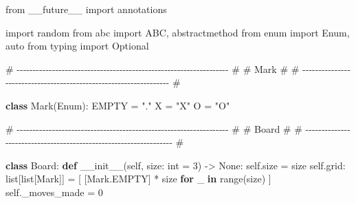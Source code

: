 \documentclass[11pt]{article}
\newenvironment{Shaded}{\begin{snugshade}}{\end{snugshade}}
\newcommand{\BuiltInTok}[1]{\textcolor[rgb]{0.50,0.55,0.55}{#1}}
\newcommand{\CommentTok}[1]{\textcolor[rgb]{0.48,0.49,0.49}{#1}}
\newcommand{\ControlFlowTok}[1]{\textcolor[rgb]{0.99,0.74,0.29}{\textbf{#1}}}
\newcommand{\DecValTok}[1]{\textcolor[rgb]{0.96,0.45,0.00}{#1}}
\newcommand{\FunctionTok}[1]{\textcolor[rgb]{0.56,0.27,0.68}{#1}}
\newcommand{\ImportTok}[1]{\textcolor[rgb]{0.15,0.68,0.38}{#1}}
\newcommand{\KeywordTok}[1]{\textcolor[rgb]{0.81,0.81,0.76}{\textbf{#1}}}
\newcommand{\NormalTok}[1]{\textcolor[rgb]{0.81,0.81,0.76}{#1}}
\newcommand{\OperatorTok}[1]{\textcolor[rgb]{0.81,0.81,0.76}{#1}}
\newcommand{\StringTok}[1]{\textcolor[rgb]{0.96,0.31,0.31}{#1}}
\newcommand{\VariableTok}[1]{\textcolor[rgb]{0.15,0.68,0.68}{#1}}
\begin{document}
\begin{Shaded}
\begin{Highlighting}[]
\ImportTok{from}\NormalTok{ \_\_future\_\_ }\ImportTok{import}\NormalTok{ annotations}

\ImportTok{import}\NormalTok{ random}
\ImportTok{from}\NormalTok{ abc }\ImportTok{import}\NormalTok{ ABC, abstractmethod}
\ImportTok{from}\NormalTok{ enum }\ImportTok{import}\NormalTok{ Enum, auto}
\ImportTok{from}\NormalTok{ typing }\ImportTok{import}\NormalTok{ Optional}


\CommentTok{\# {-}{-}{-}{-}{-}{-}{-}{-}{-}{-}{-}{-}{-}{-}{-}{-}{-}{-}{-}{-}{-}{-}{-}{-}{-}{-}{-}{-}{-}{-}{-}{-}{-}{-}{-}{-}{-}{-}{-}{-}{-}{-}{-}{-}{-}{-}{-}{-}{-}{-}{-}{-}{-}{-}{-}{-}{-}{-}{-}{-}{-}{-}{-}{-}{-}{-} \#}
\CommentTok{\# Mark                                                                \#}
\CommentTok{\# {-}{-}{-}{-}{-}{-}{-}{-}{-}{-}{-}{-}{-}{-}{-}{-}{-}{-}{-}{-}{-}{-}{-}{-}{-}{-}{-}{-}{-}{-}{-}{-}{-}{-}{-}{-}{-}{-}{-}{-}{-}{-}{-}{-}{-}{-}{-}{-}{-}{-}{-}{-}{-}{-}{-}{-}{-}{-}{-}{-}{-}{-}{-}{-}{-}{-} \#}

\KeywordTok{class}\NormalTok{ Mark(Enum):}
\NormalTok{    EMPTY }\OperatorTok{=} \StringTok{"."}
\NormalTok{    X }\OperatorTok{=} \StringTok{"X"}
\NormalTok{    O }\OperatorTok{=} \StringTok{"O"}


\CommentTok{\# {-}{-}{-}{-}{-}{-}{-}{-}{-}{-}{-}{-}{-}{-}{-}{-}{-}{-}{-}{-}{-}{-}{-}{-}{-}{-}{-}{-}{-}{-}{-}{-}{-}{-}{-}{-}{-}{-}{-}{-}{-}{-}{-}{-}{-}{-}{-}{-}{-}{-}{-}{-}{-}{-}{-}{-}{-}{-}{-}{-}{-}{-}{-}{-}{-}{-} \#}
\CommentTok{\# Board                                                               \#}
\CommentTok{\# {-}{-}{-}{-}{-}{-}{-}{-}{-}{-}{-}{-}{-}{-}{-}{-}{-}{-}{-}{-}{-}{-}{-}{-}{-}{-}{-}{-}{-}{-}{-}{-}{-}{-}{-}{-}{-}{-}{-}{-}{-}{-}{-}{-}{-}{-}{-}{-}{-}{-}{-}{-}{-}{-}{-}{-}{-}{-}{-}{-}{-}{-}{-}{-}{-}{-} \#}

\KeywordTok{class}\NormalTok{ Board:}
    \KeywordTok{def} \FunctionTok{\_\_init\_\_}\NormalTok{(}\VariableTok{self}\NormalTok{, size: }\BuiltInTok{int} \OperatorTok{=} \DecValTok{3}\NormalTok{) }\OperatorTok{{-}\textgreater{}} \VariableTok{None}\NormalTok{:}
        \VariableTok{self}\NormalTok{.size }\OperatorTok{=}\NormalTok{ size}
        \VariableTok{self}\NormalTok{.grid: }\BuiltInTok{list}\NormalTok{[}\BuiltInTok{list}\NormalTok{[Mark]] }\OperatorTok{=}\NormalTok{ [}
\NormalTok{            [Mark.EMPTY] }\OperatorTok{*}\NormalTok{ size }\ControlFlowTok{for}\NormalTok{ \_ }\KeywordTok{in} \BuiltInTok{range}\NormalTok{(size)}
\NormalTok{        ]}
        \VariableTok{self}\NormalTok{.\_moves\_made }\OperatorTok{=} \DecValTok{0}


\end{Highlighting}
\end{Shaded}
\end{document}

